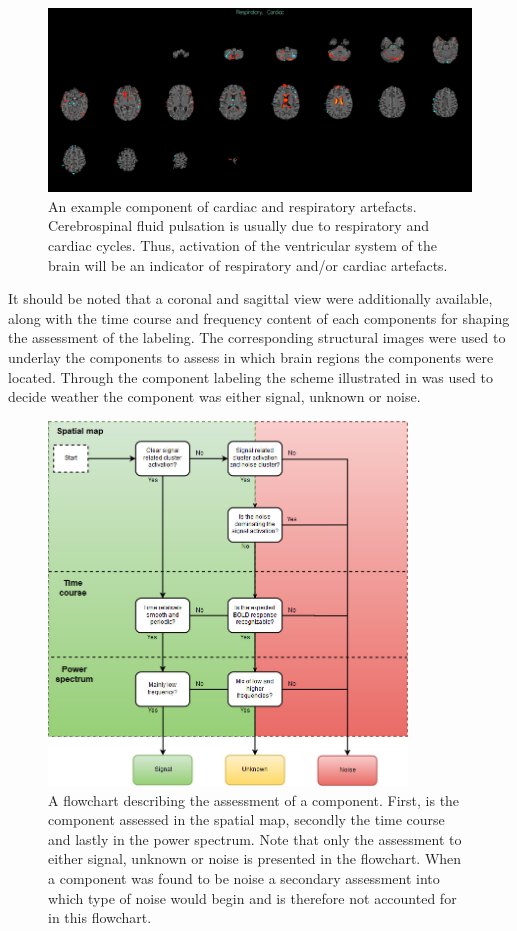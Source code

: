 \begin{figure}[H]                 
	\includegraphics[width=.85\textwidth]{figures/bMethods/card_resp}  
	\caption{An example component of cardiac and respiratory artefacts. Cerebrospinal fluid pulsation is usually due to respiratory and cardiac cycles. Thus, activation of the ventricular system of the brain will be an indicator of respiratory and/or cardiac artefacts.}
	\label{fig:meth:phys} 
\end{figure}
 It should be noted that a coronal and sagittal view were additionally available, along with the time course and frequency content of each components for shaping the assessment of the labeling. The corresponding structural images were used to underlay the components to assess in which brain regions the components were located. Through the component labeling the scheme illustrated in  was used to decide weather the component was either signal, unknown or noise. 
 
 \begin{figure}[H]                 
 	\includegraphics[width=0.85\textwidth]{figures/bMethods/Hand_labeling}  
 	\caption{A flowchart describing the assessment of a component. First, is the component assessed in the spatial map, secondly the time course and lastly in the power spectrum. Note that only the assessment to either signal, unknown or noise is presented in the flowchart. When a component was found to be noise a secondary assessment into which type of noise would begin and is therefore not accounted for in this flowchart.}
 	\label{fig:hand_label} 
 \end{figure}
